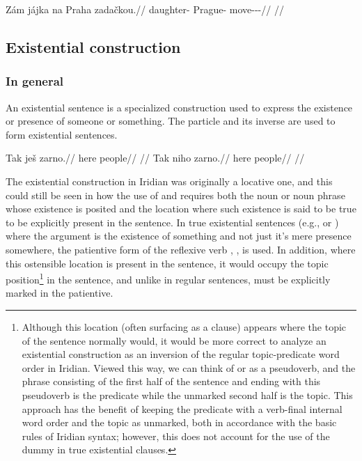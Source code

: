 \pex
\begingl
    \gla Zám jájka na Praha zadačkou.//
    \glb \Neg{} daughter-\Dim{} \Loc{} Prague-\Acc{} move-\Av{}-\Pf{}-\Nz{}//
    \glft {}//
\endgl
\xe




\subsection{Existential construction}
\label{sec:exst}

\subsubsection{In general}
An existential sentence is a specialized construction used to express the existence or presence of someone or something. The particle  and its inverse  are used to form existential sentences. 
\begin{multicols}{2}
\pex
\a\begingl
\gla Tak ješ zarno.//
\glb here \Exst{} people//
\glft {}//
\endgl
\a\begingl
\gla Tak niho zarno.//
\glb here \N{}\Exst{} people//
\glft {}//
\endgl
\xe
\end{multicols}

The existential construction in Iridian was originally a locative one, and this could still be seen in how the use of  and  requires both the noun or noun phrase whose existence is posited and the location where such existence is said to be true to be explicitly present in the sentence. In true existential sentences (e.g.,  or ) where the argument is the existence of something and not just it's mere presence somewhere, the patientive form of the reflexive verb , , is used. In addition, where this ostensible location is present in the sentence, it would occupy the topic position\footnote{Although this location (often surfacing as a  clause) appears where the topic of the sentence normally would, it would be more correct to analyze an existential construction as an inversion of the regular topic-predicate word order in Iridian. Viewed this way, we can think of  or  as a pseudoverb, and the phrase consisting of the first half of the sentence and ending with this pseudoverb is the predicate while the unmarked second half is the topic. This approach has the benefit of keeping the predicate with a verb-final internal word order and the topic as unmarked, both in accordance with the basic rules of Iridian syntax; however, this does not account for the use of the dummy  in true existential clauses.} in the sentence, and unlike in regular sentences, must be explicitly marked in the patientive.


